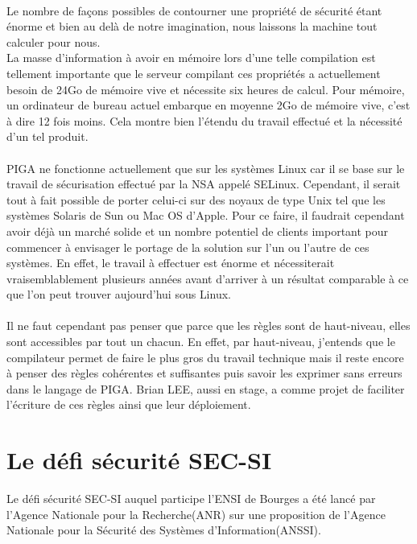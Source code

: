 		\paragraph*{}
			Le nombre de façons possibles de contourner une propriété de sécurité étant énorme et bien au delà de notre imagination, nous laissons la machine tout calculer pour nous.\\
			La masse d'information à avoir en mémoire lors d'une telle compilation est tellement importante que le serveur compilant ces propriétés a actuellement besoin de 24Go de mémoire vive et nécessite six heures de calcul. Pour mémoire, un ordinateur de bureau actuel embarque en moyenne 2Go de mémoire vive, c'est à dire 12 fois moins. 
			Cela montre bien l'étendu du travail effectué et la nécessité d'un tel produit.
			
		\paragraph*{}
			PIGA ne fonctionne actuellement que sur les systèmes Linux car il se base sur le travail de sécurisation effectué par la NSA appelé SELinux. Cependant, il serait tout à fait possible de porter celui-ci sur des noyaux de type Unix tel que les systèmes Solaris de Sun ou Mac OS d'Apple. Pour ce faire, il faudrait cependant avoir déjà un marché solide et un nombre potentiel de clients important pour commencer à envisager le portage de la solution sur l'un ou l'autre de ces systèmes. En effet, le travail à effectuer est énorme et nécessiterait vraisemblablement plusieurs années avant d'arriver à un résultat comparable à ce que l'on peut trouver aujourd'hui sous Linux.
			
		\paragraph*{}
			Il ne faut cependant pas penser que parce que les règles sont de haut-niveau, elles sont accessibles par tout un chacun. En effet, par haut-niveau, j'entends que le compilateur permet de faire le plus gros du travail technique mais il reste encore à penser des règles cohérentes et suffisantes puis savoir les exprimer sans erreurs dans le langage de PIGA.\newline
			Brian LEE, aussi en stage, a comme projet de faciliter l'écriture de ces règles ainsi que leur déploiement.
	
	\newpage
	\section{Le défi sécurité SEC-SI}
		Le défi sécurité SEC-SI auquel participe l'ENSI de Bourges a été lancé par l'Agence Nationale pour la Recherche(ANR) sur une proposition de l'Agence Nationale pour la Sécurité des Systèmes d'Information(ANSSI).
		
